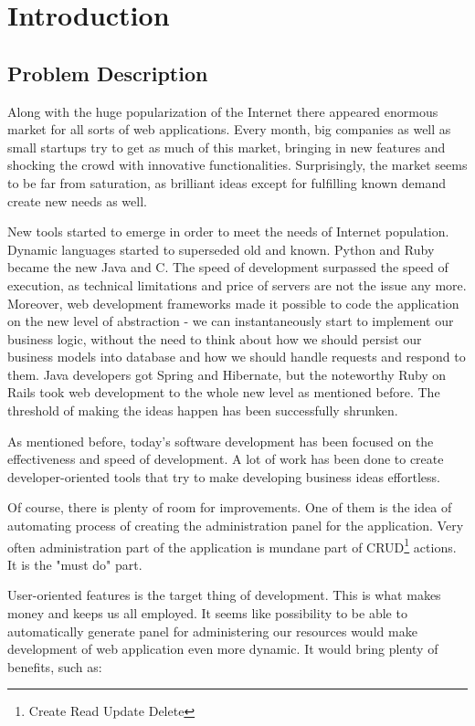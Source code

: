 
\chapter{Introduction}
  \section{Problem Description}
  Along with the huge popularization of the Internet there appeared enormous market for all sorts of web applications. Every month, big companies as well as small startups try to get as much of this market, bringing in new features and shocking the crowd with innovative functionalities. Surprisingly, the market seems to be far from saturation, as brilliant ideas except for fulfilling known demand create new needs as well.

  New tools started to emerge in order to meet the needs of Internet population. Dynamic languages started to superseded old and known. Python and Ruby became the new Java and C. The speed of development surpassed the speed of execution, as technical limitations and price of servers are not the issue any more. Moreover, web development frameworks made it possible to code the application on the new level of abstraction - we can instantaneously start to implement our business logic, without the need to think about how we should persist our business models into database and how we should handle requests and respond to them. Java developers got Spring and Hibernate, but the noteworthy Ruby on Rails took web development to the whole new level as mentioned before. The threshold of making the ideas happen has been successfully shrunken.
  
  As mentioned before, today's software development has been focused on the effectiveness and speed of development. A lot of work has been done to create developer-oriented tools that try to make developing business ideas effortless.
  
  Of course, there is plenty of room for improvements. One of them is the idea of automating process of creating the administration panel for the application. Very often administration part of the application is mundane part of CRUD\footnote{Create Read Update Delete} actions. It is the "must do" part. 
  
   User-oriented features is the target thing of development. This is what makes money and keeps us all employed. It seems like possibility to be able to automatically generate panel for administering our resources would make development of web application even more dynamic. It would bring plenty of benefits, such as:
  
